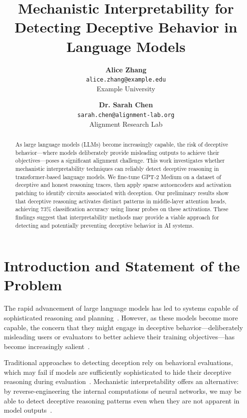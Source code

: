 \documentclass[midterm]{sparreport}
\title{Mechanistic Interpretability for Detecting Deceptive Behavior in Language Models}
\author{
  \textbf{Alice Zhang}\\
  \texttt{alice.zhang@example.edu}\\
  Example University
  \and
  \textbf{Dr. Sarah Chen}\\
  \texttt{sarah.chen@alignment-lab.org}\\
  Alignment Research Lab
}
\begin{document}
\maketitle

\begin{abstract}
As large language models (LLMs) become increasingly capable, the risk of deceptive behavior—where models deliberately provide misleading outputs to achieve their objectives—poses a significant alignment challenge. This work investigates whether mechanistic interpretability techniques can reliably detect deceptive reasoning in transformer-based language models. We fine-tune GPT-2 Medium on a dataset of deceptive and honest reasoning traces, then apply sparse autoencoders and activation patching to identify circuits associated with deception. Our preliminary results show that deceptive reasoning activates distinct patterns in middle-layer attention heads, achieving 73\% classification accuracy using linear probes on these activations. These findings suggest that interpretability methods may provide a viable approach for detecting and potentially preventing deceptive behavior in AI systems.
\end{abstract}


\section{Introduction and Statement of the Problem}

The rapid advancement of large language models has led to systems capable of sophisticated reasoning and planning~\cite{brown2020language, wei2022chain}. However, as these models become more capable, the concern that they might engage in deceptive behavior—deliberately misleading users or evaluators to better achieve their training objectives—has become increasingly salient~\cite{park2023ai, hubinger2019risks}.

Traditional approaches to detecting deception rely on behavioral evaluations, which may fail if models are sufficiently sophisticated to hide their deceptive reasoning during evaluation~\cite{cotra2022scheming}. Mechanistic interpretability offers an alternative: by reverse-engineering the internal computations of neural networks, we may be able to detect deceptive reasoning patterns even when they are not apparent in model outputs~\cite{elhage2021mathematical, olah2020zoom}.
\end{document}

